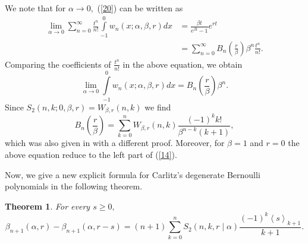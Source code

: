 \documentclass{article}%
\newtheorem{theorem}{Theorem}
\begin{document}
We note that for $\alpha\rightarrow0,$ (\ref{20}) can be written as
\begin{align*}
\underset{\alpha\rightarrow0}{\lim}\sum_{n=0}^{\infty}\frac{t^{n}}{n!}%
{\displaystyle\int\limits_{-1}^{0}}
w_{n}\left(  x;\alpha,\beta,r\right)  dx  &  =\frac{\beta t}{e^{\beta t}%
-1}e^{rt}\\
&  =\sum_{n=0}^{\infty}B_{n}\left(  \frac{r}{\beta}\right)  \beta^{n}%
\frac{t^{n}}{n!}.
\end{align*}
Comparing the coefficients of $\frac{t^{n}}{n!}$ in the above equation, we
obtain%
\[
\underset{\alpha\rightarrow0}{\lim}%
{\displaystyle\int\limits_{-1}^{0}}
w_{n}\left(  x;\alpha,\beta,r\right)  dx=B_{n}\left(  \frac{r}{\beta}\right)
\beta^{n}.
\]
Since $S_{2}\left(  n,k;0,\beta,r\right)  =W_{\beta,r}\left(  n,k\right)  $ we
find
\[
B_{n}\left(  \frac{r}{\beta}\right)  =\sum_{k=0}^{n}W_{\beta,r}\left(
n,k\right)  \frac{\left(  -1\right)  ^{k}k!}{\beta^{n-k}\left(  k+1\right)
},
\]
which was also given in \cite{Mihioubi2} with a different proof. Moreover, for
$\beta=1$ and $r=0$ the above equation reduce to the left part of (\ref{14}).

Now, we give a new explicit formula for Carlitz's degenerate Bernoulli
polynomials in the following theorem.

\begin{theorem}
For every $s\geq0,$
\begin{equation}
\beta_{n+1}\left(  \alpha,r\right)  -\beta_{n+1}\left(  \alpha,r-s\right)
=\left(  n+1\right)  \sum_{k=0}^{n}S_{2}\left(  n,k,r\mid\alpha\right)
\frac{\left(  -1\right)  ^{k}\left\langle s\right\rangle _{k+1}}{k+1}.
\label{29}%
\end{equation}

\end{theorem}
\end{document}
